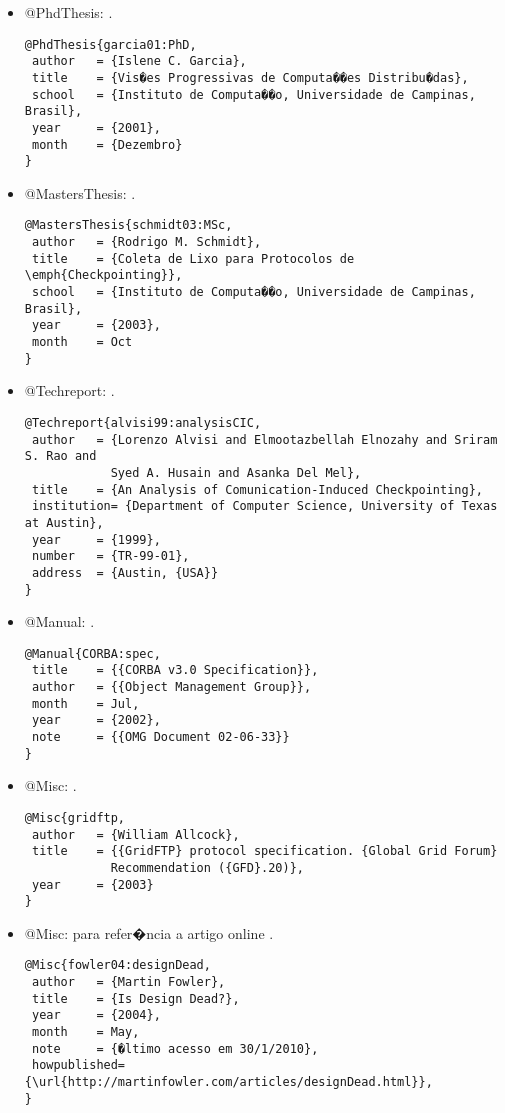 \begin{itemize}
\item @PhdThesis: \cite{garcia01:PhD}.
{\scriptsize\begin{verbatim}
@PhdThesis{garcia01:PhD,
 author   = {Islene C. Garcia},
 title    = {Vis�es Progressivas de Computa��es Distribu�das},
 school   = {Instituto de Computa��o, Universidade de Campinas, Brasil},
 year     = {2001},
 month    = {Dezembro}
}
\end{verbatim}}

\item @MastersThesis: \cite{schmidt03:MSc}.
{\scriptsize\begin{verbatim}
@MastersThesis{schmidt03:MSc,
 author   = {Rodrigo M. Schmidt},
 title    = {Coleta de Lixo para Protocolos de \emph{Checkpointing}},
 school   = {Instituto de Computa��o, Universidade de Campinas, Brasil},
 year     = {2003},
 month    = Oct
}
\end{verbatim}}

\item @Techreport: \cite{alvisi99:analysisCIC}.
{\scriptsize\begin{verbatim}
@Techreport{alvisi99:analysisCIC,
 author   = {Lorenzo Alvisi and Elmootazbellah Elnozahy and Sriram S. Rao and
            Syed A. Husain and Asanka Del Mel},
 title    = {An Analysis of Comunication-Induced Checkpointing},
 institution= {Department of Computer Science, University of Texas at Austin},
 year     = {1999},
 number   = {TR-99-01},
 address  = {Austin, {USA}}
}
\end{verbatim}}

\item @Manual: \cite{CORBA:spec}.
{\scriptsize\begin{verbatim}
@Manual{CORBA:spec,
 title    = {{CORBA v3.0 Specification}},
 author   = {{Object Management Group}},
 month    = Jul,
 year     = {2002},
 note     = {{OMG Document 02-06-33}}
}
\end{verbatim}}

\item @Misc: \cite{gridftp}.
{\scriptsize\begin{verbatim}
@Misc{gridftp,
 author   = {William Allcock},
 title    = {{GridFTP} protocol specification. {Global Grid Forum}
            Recommendation ({GFD}.20)},
 year     = {2003}
}
\end{verbatim}}

\item @Misc: para refer�ncia a artigo online \cite{fowler04:designDead}.
{\scriptsize\begin{verbatim}
@Misc{fowler04:designDead,
 author   = {Martin Fowler},
 title    = {Is Design Dead?},
 year     = {2004},
 month    = May,
 note     = {�ltimo acesso em 30/1/2010},
 howpublished= {\url{http://martinfowler.com/articles/designDead.html}},
}
\end{verbatim}}


\end{itemize}
